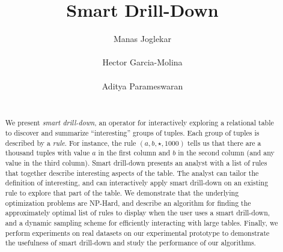 \documentclass{vldb}
\newcounter{prob}
\newcommand{\techreporttext}[1]{}
\begin{document}
\title{Smart Drill-Down}
\author{
\alignauthor
Manas Joglekar\\
       \\
\alignauthor
Hector Garcia-Molina\\
       \\
\alignauthor 
Aditya Parameswaran\\
       \\
}
\maketitle

\begin{abstract}
We present {\em smart drill-down},
an operator for interactively exploring a relational table
to discover and summarize ``interesting'' groups of tuples.
Each group of tuples is described by a {\em rule}.
For instance, the rule $(a, b, \star, 1000)$ tells us that
there are a thousand tuples with value $a$ in the first column and $b$
in the second column (and any value in the third column).
Smart drill-down presents an analyst with a list of rules that
together describe interesting aspects of the table.
The analyst can tailor the definition of interesting,
and can interactively apply smart drill-down on an existing rule to
explore that part of the table.
We demonstrate that the underlying optimization problems 
are {\sc NP-Hard}, and describe an
algorithm for finding the approximately optimal list of rules to display when the user uses a smart drill-down, and a dynamic sampling scheme for efficiently interacting with large tables. Finally, we
perform experiments on real datasets on our experimental prototype to demonstrate the usefulness of smart drill-down and study the performance of our algorithms.
\end{abstract}








{\small

  
}


\techreporttext{}
\end{document}
